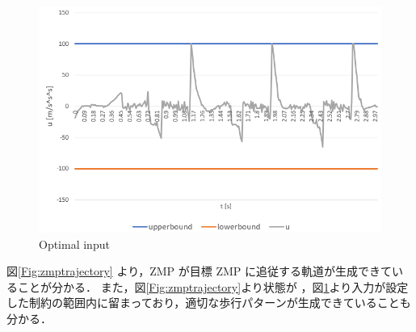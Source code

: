 \begin{figure}[hbtp]
  \centering
 \includegraphics[keepaspectratio, scale=0.6]
      {images/calculated_input.png}
\caption{Optimal input}
 \label{Fig:optimalinput}
\end{figure}

\newpage
図\ref{Fig:zmptrajectory} より，ZMP が目標 ZMP に追従する軌道が生成できていることが分かる． また，図\ref{Fig:zmptrajectory}より状態が ，図\ref{Fig:optimalinput}より入力が設定した制約の範囲内に留まっており，適切な歩行パターンが生成できていることも分かる．


